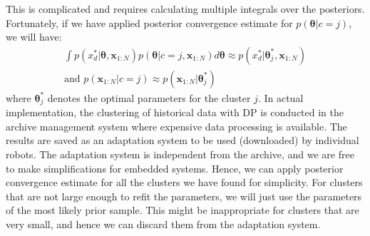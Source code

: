 This is complicated and requires calculating multiple integrals over the posteriors. 
Fortunately, if we have applied posterior convergence estimate for $p(\bm{\theta}|c=j)$, we will have:
\begin{equation}
\begin{gathered}
\int p(x^*_d|\bm{\theta}, \bm{x}_{1:N})p(\bm{\theta}|c=j, \bm{x}_{1:N}) d\bm{\theta} \approx p(x^*_d|\bm{\theta}^*_j, \bm{x}_{1:N})
\\
\text{and } p(\bm{x}_{1:N}|c=j) \approx p(\bm{x}_{1:N}|\bm{\theta}^*_j)
\end{gathered}
\label{posterior_convergence_simplification}
\end{equation}
where $\bm{\theta}^*_j$ denotes the optimal parameters for the cluster $j$.
In actual implementation, the clustering of historical data with DP is conducted in the archive management system where expensive data processing is available. 
The results are saved as an adaptation system to be used (downloaded) by individual robots.
The adaptation system is independent from the archive, and we are free to make simplifications for embedded systems.
Hence, we can apply posterior convergence estimate for all the clusters we have found for simplicity.
For clusters that are not large enough to refit the parameters, we will just use the parameters of the most likely prior sample.
This might be inappropriate for clusters that are very small, and hence we can discard them from the adaptation system.


